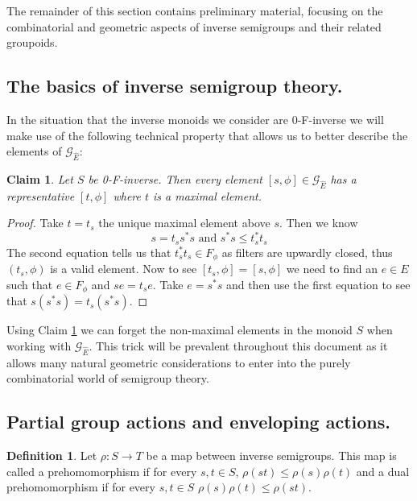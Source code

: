 \documentclass[11pt]{amsart}
\theoremstyle{plain}
\newtheorem{claim}[theorem]{Claim}%
\theoremstyle{definition}%
\newtheorem{definition}[theorem]{Definition}%
\theoremstyle{remark}%
\newcommand{\G}{\mathcal{G}}
\newcommand{\E}{\widehat{E}}
\begin{document}
The remainder of this section contains preliminary material, focusing on the combinatorial and geometric aspects of inverse semigroups and their related groupoids.

\subsection{The basics of inverse semigroup theory.}



In the situation that the inverse monoids we consider are 0-F-inverse we will make use of the following technical property that allows us to better describe the elements of $\mathcal{G}_{\E}$:

\begin{claim}\label{MainClaim:C1}
Let $S$ be 0-F-inverse. Then every element $[s,\phi] \in \G_{\E}$ has a representative $[t,\phi]$ where $t$ is a maximal element.
\end{claim}
\begin{proof}
Take $t=t_{s}$ the unique maximal element above $s$. Then we know 
\begin{equation*}
s = t_{s}s^{*}s \mbox{ and } s^{*}s \leq t_{s}^{*}t_{s}
\end{equation*} 
The second equation tells us that $t_{s}^{*}t_{s} \in F_{\phi}$ as filters are upwardly closed, thus $(t_{s},\phi)$ is a valid element. Now to see $[t_{s},\phi]=[s,\phi]$ we need to find an $e \in E$ such that $e \in F_{\phi}$ and $se=t_{s}e$. Take $e=s^{*}s$ and then use the first equation to see that $s(s^{*}s)=t_{s}(s^{*}s)$.
\end{proof}
Using Claim \ref{MainClaim:C1} we can forget the non-maximal elements in the monoid $S$ when working with $\G_{\E}$. This trick will be prevalent throughout this document as it allows many natural geometric considerations to enter into the purely combinatorial world of semigroup theory.

\subsection{Partial group actions and enveloping actions.}\label{sect:BRE}
\begin{definition}
Let $\rho: S \rightarrow T$ be a map between inverse semigroups. This map is called a prehomomorphism if for every $s,t \in S$, $\rho(st) \leq \rho(s)\rho(t)$ and a dual prehomomorphism if for every $s,t \in S$ $\rho(s)\rho(t) \leq \rho(st)$.
\end{definition}
\end{document}
